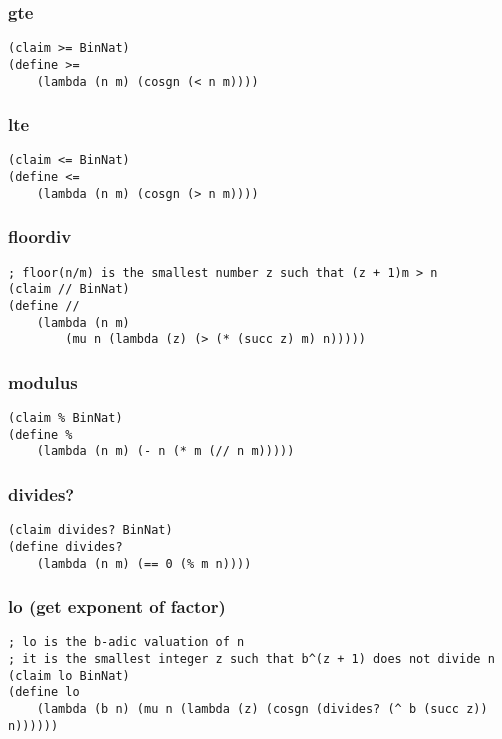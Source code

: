 \subsubsection{gte} \label{code:gte}
\begin{verbatim}
(claim >= BinNat)
(define >=
    (lambda (n m) (cosgn (< n m))))
\end{verbatim}

\subsubsection{lte} \label{code:lte}
\begin{verbatim}
(claim <= BinNat)
(define <=
    (lambda (n m) (cosgn (> n m))))
\end{verbatim}

\subsubsection{floordiv} \label{code:floordiv}
\begin{verbatim}
; floor(n/m) is the smallest number z such that (z + 1)m > n
(claim // BinNat)
(define //
    (lambda (n m)
        (mu n (lambda (z) (> (* (succ z) m) n)))))
\end{verbatim}

\subsubsection{modulus} \label{code:modulus}
\begin{verbatim}
(claim % BinNat)
(define %
    (lambda (n m) (- n (* m (// n m)))))
\end{verbatim}

\subsubsection{divides?} \label{code:divides?}
\begin{verbatim}
(claim divides? BinNat)
(define divides?
    (lambda (n m) (== 0 (% m n))))
\end{verbatim}

\subsubsection{lo (get exponent of factor)} \label{code:lo}
\begin{verbatim}
; lo is the b-adic valuation of n
; it is the smallest integer z such that b^(z + 1) does not divide n
(claim lo BinNat)
(define lo
    (lambda (b n) (mu n (lambda (z) (cosgn (divides? (^ b (succ z)) n))))))
\end{verbatim}

